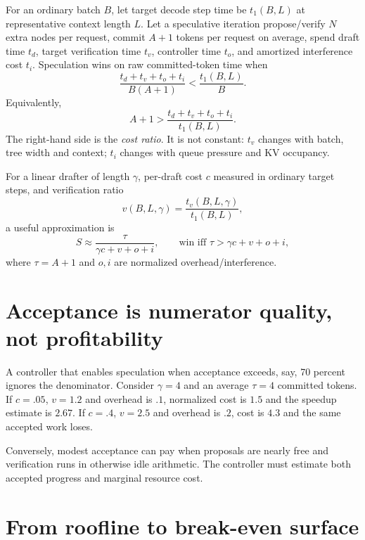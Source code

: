 
For an ordinary batch $B$, let target decode step time be $t_1(B,L)$ at representative
context length $L$. Let a speculative iteration propose/verify $N$ extra nodes per
request, commit $A+1$ tokens per request on average, spend draft time $t_d$, target
verification time $t_v$, controller time $t_o$, and amortized interference cost $t_i$.
Speculation wins on raw committed-token time when
\begin{equation}
\frac{t_d+t_v+t_o+t_i}{B(A+1)}
<
\frac{t_1(B,L)}{B}.
\label{eq:general-break-even}
\end{equation}
Equivalently,
\begin{equation}
A+1 >
\frac{t_d+t_v+t_o+t_i}{t_1(B,L)}.
\label{eq:accepted-break-even}
\end{equation}
The right-hand side is the \emph{cost ratio}. It is not constant: $t_v$ changes with
batch, tree width and context; $t_i$ changes with queue pressure and KV occupancy.

For a linear drafter of length $\gamma$, per-draft cost $c$ measured in ordinary target
steps, and verification ratio
\[
v(B,L,\gamma)=\frac{t_v(B,L,\gamma)}{t_1(B,L)},
\]
a useful approximation is
\begin{equation}
S \approx \frac{\tau}{\gamma c+v+o+i},
\qquad
\text{win iff }\tau>\gamma c+v+o+i ,
\label{eq:linear-break-even}
\end{equation}
where $\tau=A+1$ and $o,i$ are normalized overhead/interference.

\section{Acceptance is numerator quality, not profitability}

A controller that enables speculation when acceptance exceeds, say, 70 percent ignores
the denominator. Consider $\gamma=4$ and an average $\tau=4$ committed tokens. If
$c=.05$, $v=1.2$ and overhead is $.1$, normalized cost is $1.5$ and the speedup estimate
is $2.67$. If $c=.4$, $v=2.5$ and overhead is $.2$, cost is $4.3$ and the same accepted
work loses.

Conversely, modest acceptance can pay when proposals are nearly free and verification
runs in otherwise idle arithmetic. The controller must estimate both accepted progress
and marginal resource cost.

\section{From roofline to break-even surface}

